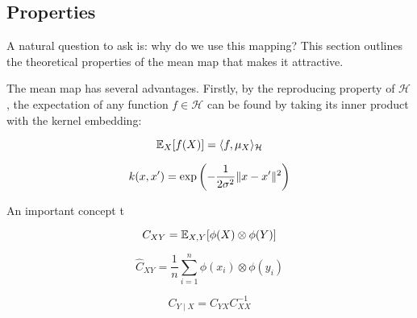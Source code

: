\subsection{Properties}
A natural question to ask is: why do we use this mapping? This section outlines the theoretical properties of the mean map that makes it attractive.

The mean map has several advantages. Firstly, by the reproducing property of $\mathcal{H}$, the expectation of any function $f \in \mathcal{H}$ can be found by taking its inner product with the kernel embedding:

\begin{equation}
\mathbb{E}_X[f(X)] = \langle f, \mu_X\rangle_\mathcal{H}
\end{equation}

\begin{equation}
  k(x,x') = \exp\left(-\frac{1}{2\sigma^2} \lVert x-x'\rVert^2 \right)
\end{equation}

An important concept t

\begin{equation}
  C_{XY} = \mathbb{E}_{X, Y}[\phi(X) \otimes \phi(Y)]
\end{equation}

\begin{equation}
  \widehat{C}_{XY} = \frac{1}{n} \sum_{i=1}^n \phi(x_i) \otimes \phi(y_i)
\end{equation}

\begin{equation}
  C_{Y \mid X} = C_{YX} C_{XX}^{-1}
\end{equation}
